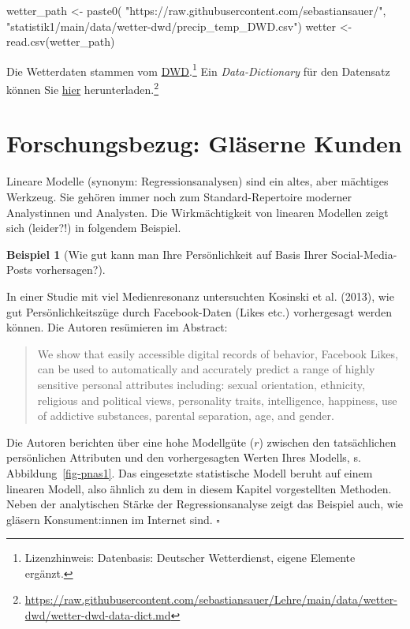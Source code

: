 \documentclass[
  letterpaper,
  twoside,
  open=any]{scrbook}
\newenvironment{Shaded}{\begin{snugshade}}{\end{snugshade}}
\newcommand{\FunctionTok}[1]{\textcolor[rgb]{0.28,0.35,0.67}{#1}}
\newcommand{\NormalTok}[1]{\textcolor[rgb]{0.00,0.23,0.31}{#1}}
\newcommand{\OtherTok}[1]{\textcolor[rgb]{0.00,0.23,0.31}{#1}}
\newcommand{\StringTok}[1]{\textcolor[rgb]{0.13,0.47,0.30}{#1}}
\theoremstyle{definition}
\theoremstyle{definition}
\theoremstyle{definition}
\newtheorem{example}{Beispiel}[chapter]
\theoremstyle{remark}
\begin{document}
\begin{Shaded}
\begin{Highlighting}[]
\NormalTok{wetter\_path }\OtherTok{\textless{}{-}} \FunctionTok{paste0}\NormalTok{(}
  \StringTok{"https://raw.githubusercontent.com/sebastiansauer/"}\NormalTok{,}
  \StringTok{"statistik1/main/data/wetter{-}dwd/precip\_temp\_DWD.csv"}\NormalTok{)}
\NormalTok{wetter }\OtherTok{\textless{}{-}} \FunctionTok{read.csv}\NormalTok{(wetter\_path)}
\end{Highlighting}
\end{Shaded}

Die Wetterdaten stammen vom
\href{https://opendata.dwd.de/}{DWD}.\footnote{Lizenzhinweis:
  Datenbasis: Deutscher Wetterdienst, eigene Elemente ergänzt.} Ein
\emph{Data-Dictionary} für den Datensatz können Sie
\href{https://raw.githubusercontent.com/sebastiansauer/Lehre/main/data/wetter-dwd/wetter-dwd-data-dict.md}{hier}
herunterladen.\footnote{\url{https://raw.githubusercontent.com/sebastiansauer/Lehre/main/data/wetter-dwd/wetter-dwd-data-dict.md}}

\section{Forschungsbezug: Gläserne
Kunden}\label{forschungsbezug-gluxe4serne-kunden}

Lineare Modelle (synonym: Regressionsanalysen) sind ein altes, aber
mächtiges Werkzeug. Sie gehören immer noch zum Standard-Repertoire
moderner Analystinnen und Analysten. Die Wirkmächtigkeit von linearen
Modellen zeigt sich (leider?!) in folgendem Beispiel.

\begin{example}[Wie gut kann man Ihre Persönlichkeit auf Basis Ihrer
Social-Media-Posts
vorhersagen?]\protect\hypertarget{exm-kosinski}{}\label{exm-kosinski}

In einer Studie mit viel Medienresonanz untersuchten Kosinski et al.
(2013), wie gut Persönlichkeitszüge durch Facebook-Daten (Likes etc.)
vorhergesagt werden können. Die Autoren resümieren im Abstract:

\begin{quote}
We show that easily accessible digital records of behavior, Facebook
Likes, can be used to automatically and accurately predict a range of
highly sensitive personal attributes including: sexual orientation,
ethnicity, religious and political views, personality traits,
intelligence, happiness, use of addictive substances, parental
separation, age, and gender.
\end{quote}

Die Autoren berichten über eine hohe Modellgüte (\(r\)) zwischen den
tatsächlichen persönlichen Attributen und den vorhergesagten Werten
Ihres Modells, s. Abbildung~\ref{fig-pnas1}. Das eingesetzte
statistische Modell beruht auf einem linearen Modell, also ähnlich zu
dem in diesem Kapitel vorgestellten Methoden. Neben der analytischen
Stärke der Regressionsanalyse zeigt das Beispiel auch, wie gläsern
Konsument:innen im Internet sind. \(\square\)

\end{example}
\end{document}
